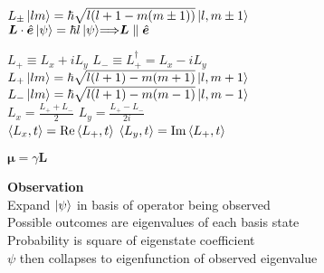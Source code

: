 \documentclass[11pt, a4paper]{article}
\newcommand{\newsec}[1]{\vspace{2mm}\textbf{#1}\\}
\renewcommand{\vec}[1]{\bm{#1}} %
\newcommand{\uvec}[1]{\hat{\vec{#1}}} %
\let\spaceyimplies\implies
\renewcommand{\implies}{\hspace{-1mm}\spaceyimplies\hspace{-1mm}}
\begin{document}
\begin{multicols}{2}
$L_\pm \ket{lm} = \hbar \sqrt{l(l+1 - m (m \pm 1))} \ket{l, m \pm 1}$ \medskip \\


$ \vec{L}\cdot \uvec{e} \ket{\psi} = \hbar l \ket{\psi} \implies \vec{L} \parallel \uvec{e} $

$ L_{+} \equiv L_{x} + i L_{y} $ \qquad $ L_{-} \equiv L_{+}^{\dagger} = L_{x} - i L_{y} $\\
$ L_{+}\ket{lm} = \hbar \sqrt{l (l+1) - m(m+1)} \ket{l, m+1} $ \\
$ L_{-}\ket{lm} = \hbar \sqrt{l (l+1) - m(m-1)} \ket{l, m-1}  $\\
$ L_{x} = \frac{L_{+} + L_{-}}{2} $ \qquad \qquad \quad  $ L_{y} = \frac{L_{+} - L_{-}}{2i} $\\
$ \ev{L_{x}, t} = \Re \ev{L_{+}, t} $ \qquad $ \ev{L_{y}, t}= \Im \ev{L_{+}, t} $

$ \bm{\mu} = \gamma \bm{L} $

\newsec{Observation}
Expand $ \ket{\psi} $ in basis of operator being observed\\
Possible outcomes are eigenvalues of each basis state\\
Probability is square of eigenstate coefficient\\
$ \psi $ then collapses to eigenfunction of observed eigenvalue



\end{multicols}
\end{document}
